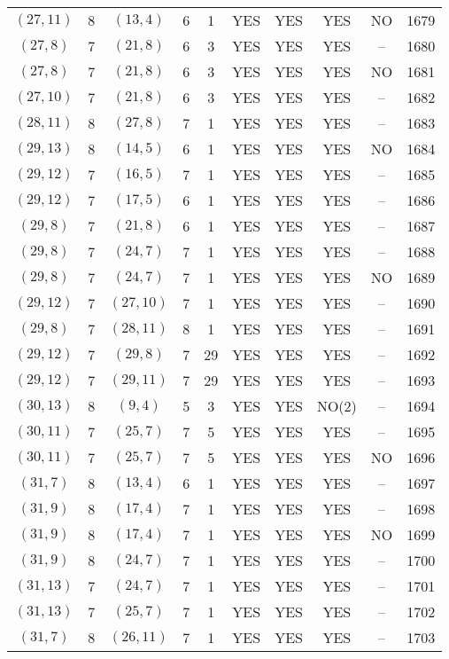 \begin{longtable}{|c|c|c|c|c|c|c|c|c|c|}
$(27, 11)$ & 8 & $(13, 4)$ & 6 & 1 & YES & YES & YES & NO & 1679\\
$(27, 8)$ & 7 & $(21, 8)$ & 6 & 3 & YES & YES & YES & -- & 1680\\
$(27, 8)$ & 7 & $(21, 8)$ & 6 & 3 & YES & YES & YES & NO & 1681\\
$(27, 10)$ & 7 & $(21, 8)$ & 6 & 3 & YES & YES & YES & -- & 1682\\
$(28, 11)$ & 8 & $(27, 8)$ & 7 & 1 & YES & YES & YES & -- & 1683\\
$(29, 13)$ & 8 & $(14, 5)$ & 6 & 1 & YES & YES & YES & NO & 1684\\
$(29, 12)$ & 7 & $(16, 5)$ & 7 & 1 & YES & YES & YES & -- & 1685\\
$(29, 12)$ & 7 & $(17, 5)$ & 6 & 1 & YES & YES & YES & -- & 1686\\
$(29, 8)$ & 7 & $(21, 8)$ & 6 & 1 & YES & YES & YES & -- & 1687\\
$(29, 8)$ & 7 & $(24, 7)$ & 7 & 1 & YES & YES & YES & -- & 1688\\
$(29, 8)$ & 7 & $(24, 7)$ & 7 & 1 & YES & YES & YES & NO & 1689\\
$(29, 12)$ & 7 & $(27, 10)$ & 7 & 1 & YES & YES & YES & -- & 1690\\
$(29, 8)$ & 7 & $(28, 11)$ & 8 & 1 & YES & YES & YES & -- & 1691\\
$(29, 12)$ & 7 & $(29, 8)$ & 7 & 29 & YES & YES & YES & -- & 1692\\
$(29, 12)$ & 7 & $(29, 11)$ & 7 & 29 & YES & YES & YES & -- & 1693\\
$(30, 13)$ & 8 & $(9, 4)$ & 5 & 3 & YES & YES & NO(2) & -- & 1694\\
$(30, 11)$ & 7 & $(25, 7)$ & 7 & 5 & YES & YES & YES & -- & 1695\\
$(30, 11)$ & 7 & $(25, 7)$ & 7 & 5 & YES & YES & YES & NO & 1696\\
$(31, 7)$ & 8 & $(13, 4)$ & 6 & 1 & YES & YES & YES & -- & 1697\\
$(31, 9)$ & 8 & $(17, 4)$ & 7 & 1 & YES & YES & YES & -- & 1698\\
$(31, 9)$ & 8 & $(17, 4)$ & 7 & 1 & YES & YES & YES & NO & 1699\\
$(31, 9)$ & 8 & $(24, 7)$ & 7 & 1 & YES & YES & YES & -- & 1700\\
$(31, 13)$ & 7 & $(24, 7)$ & 7 & 1 & YES & YES & YES & -- & 1701\\
$(31, 13)$ & 7 & $(25, 7)$ & 7 & 1 & YES & YES & YES & -- & 1702\\
$(31, 7)$ & 8 & $(26, 11)$ & 7 & 1 & YES & YES & YES & -- & 1703\\

\end{longtable}

